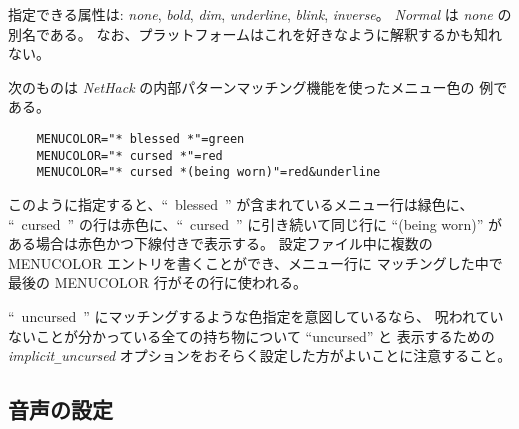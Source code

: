 指定できる属性は:
{\it none}, {\it bold}, {\it dim}, {\it underline},
{\it blink}, {\it inverse}。
{\it Normal\/} は {\it none} の別名である。
なお、プラットフォームはこれを好きなように解釈するかも知れない。

次のものは {\it NetHack \/} の内部パターンマッチング機能を使ったメニュー色の
例である。

\begin{verbatim}
    MENUCOLOR="* blessed *"=green
    MENUCOLOR="* cursed *"=red
    MENUCOLOR="* cursed *(being worn)"=red&underline
\end{verbatim}

このように指定すると、``~blessed~'' が含まれているメニュー行は緑色に、
``~cursed~'' の行は赤色に、``~cursed~'' に引き続いて同じ行に ``(being worn)'' が
ある場合は赤色かつ下線付きで表示する。
設定ファイル中に複数の MENUCOLOR エントリを書くことができ、メニュー行に
マッチングした中で最後の MENUCOLOR 行がその行に使われる。

``~uncursed~'' にマッチングするような色指定を意図しているなら、
呪われていないことが分かっている全ての持ち物について ``uncursed'' と
表示するための
{\it implicit\verb+_+uncursed\/}
オプションをおそらく設定した方がよいことに注意すること。

\subsection*{音声の設定}


